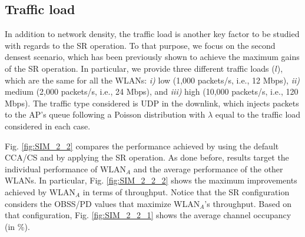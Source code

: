 \documentclass[comsoc]{IEEEtran}
\begin{document}
	\subsection{Traffic load}
	\label{section:random_scenarios_traffic_load}
	In addition to network density, the traffic load is another key factor to be studied with regards to the SR operation. To that purpose, we focus on the second densest scenario, which has been previously shown to achieve the maximum gains of the SR operation. In particular, we provide three different traffic loads ($l$), which are the same for all the WLANs: \emph{i)} low (1,000 packets/s, i.e., 12 Mbps), \emph{ii)} medium (2,000 packets/s, i.e., 24 Mbps), and \emph{iii)} high (10,000 packets/s, i.e., 120 Mbps). The traffic type considered is UDP in the downlink, which injects packets to the AP's queue following a Poisson distribution with $\lambda$ equal to the traffic load considered in each case.
		
	Fig. \ref{fig:SIM_2_2} compares the performance achieved by using the default CCA/CS and by applying the SR operation. As done before, results target the individual performance of $\text{WLAN}_A$ and the average performance of the other WLANs. In particular, Fig. \ref{fig:SIM_2_2_2} shows the maximum improvements achieved by WLAN$_A$ in terms of throughput. Notice that the SR configuration considers the OBSS/PD values that maximize WLAN$_A$'s throughput. Based on that configuration, Fig. \ref{fig:SIM_2_2_1} shows the average channel occupancy (in \%).
	
\end{document}

